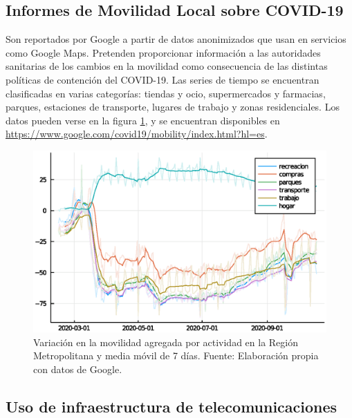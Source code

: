 
\subsection{Informes de Movilidad Local sobre COVID-19}\label{sec:google}

Son reportados por Google a partir de datos anonimizados que usan en servicios como Google Maps. Pretenden proporcionar información a las autoridades sanitarias de los cambios en la movilidad como consecuencia de las distintas políticas de contención del COVID-19. Las series de tiempo se encuentran clasificadas en varias categorías: tiendas y ocio, supermercados y farmacias, parques, estaciones de transporte, lugares de trabajo y zonas residenciales. Los datos pueden verse en la figura \ref{img:google-movilidad-RM}, y se encuentran disponibles en \url{https://www.google.com/covid19/mobility/index.html?hl=es}.

\begin{figure}[H]
\centering
\includegraphics[width=.7\textwidth]{img/metodologia/datos/explorar_movilidad_google_6_1.eps}
\caption{Variación en la movilidad agregada por actividad en la Región Metropolitana y media móvil de 7 días. Fuente: Elaboración propia con datos de Google.}
\label{img:google-movilidad-RM}
\end{figure}


\subsection{Uso de infraestructura de telecomunicaciones}\label{data:isci}

